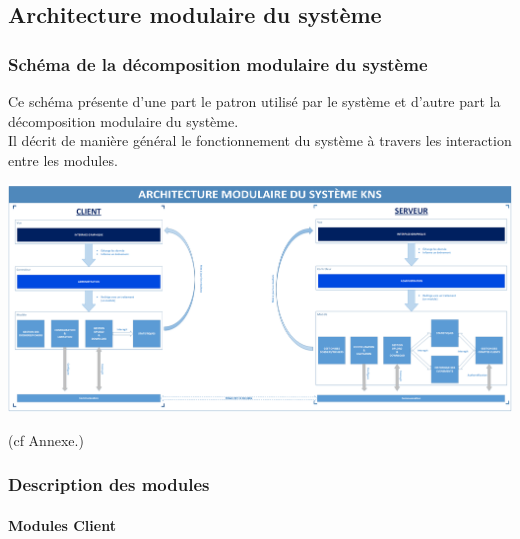 \documentclass[10pt,a4paper]{report}
\begin{document}
	\subsection{Architecture modulaire du système}

		\subsubsection{Schéma de la décomposition modulaire du système}
			\begin{flushleft}
			Ce schéma présente d'une part le patron utilisé par le système et d'autre part la décomposition modulaire du système.\\
			Il décrit de manière général le fonctionnement du système à travers les interaction entre les modules.
			\end{flushleft}
			\begin{center}
				\includegraphics[scale=0.23]{Ressources/modules_KNS.png}
			\end{center}
		(cf Annexe.)

		\subsubsection{Description des modules}
		
			\paragraph{Modules Client}
\end{document}
